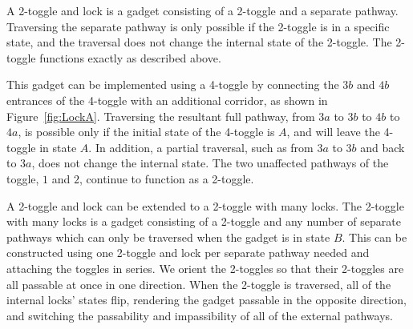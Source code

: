 A 2-toggle and lock is a gadget consisting of a 2-toggle and a separate pathway. Traversing the separate pathway is only possible if the 2-toggle is in a specific state, and the traversal does not change the internal state of the 2-toggle. The 2-toggle functions exactly as described above.

This gadget can be implemented using a 4-toggle by
connecting the $3b$ and $4b$ entrances of the 4-toggle with an additional corridor, as shown in Figure~\ref{fig:LockA}.
Traversing the resultant full pathway, from $3a$ to $3b$ to $4b$ to $4a$, is possible only if the initial
state of the 4-toggle is $A$, and will leave the 4-toggle in state $A$. In addition, a partial traversal,
such as from $3a$ to $3b$ and back to $3a$, does not change the internal state. The two unaffected
pathways of the toggle, $1$ and $2$, continue to function as a 2-toggle.


A 2-toggle and lock can be extended to a 2-toggle with many locks. The 2-toggle with many locks is a gadget consisting of a 2-toggle and any number of separate pathways which can only be traversed when the gadget is in state $B$. This can be constructed using one 2-toggle and lock per separate pathway needed and attaching the toggles in series.
We orient the 2-toggles so that their 2-toggles are all passable at once in one direction.
When the 2-toggle is traversed, all of the internal locks' states flip, rendering the gadget passable in the opposite direction, and switching the passability and impassibility of all of the external pathways.




